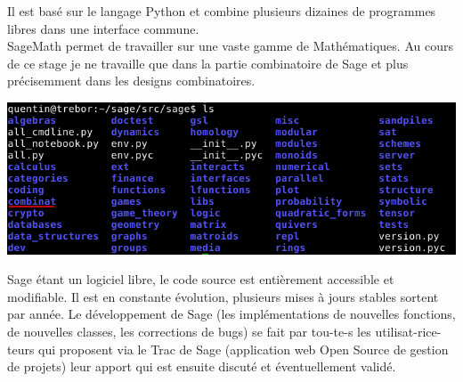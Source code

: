 \documentclass[a4paper]{article}
\begin{document}
Il est basé sur le langage Python et combine plusieurs dizaines de programmes libres dans une interface commune.\\
SageMath permet de travailler sur une vaste gamme de Mathématiques. Au cours de ce stage je ne travaille que dans la partie combinatoire de Sage et plus précisemment dans les designs combinatoires.
\vspace{3\baselineskip}
\begin{center}
  \includegraphics[scale=0.6]{matieres.jpg}
\end{center}
\vspace{3\baselineskip}
Sage étant un logiciel libre, le code source est entièrement accessible et modifiable. Il est en constante évolution, plusieurs mises à jours stables sortent par année. Le développement de Sage (les implémentations de nouvelles fonctions, de nouvelles classes, les corrections de bugs) se fait par tou-te-s les utilisat-rice-teurs qui proposent via le Trac de Sage (application web Open Source de gestion de projets) leur apport qui est ensuite discuté et éventuellement validé.
\newpage
\end{document}
